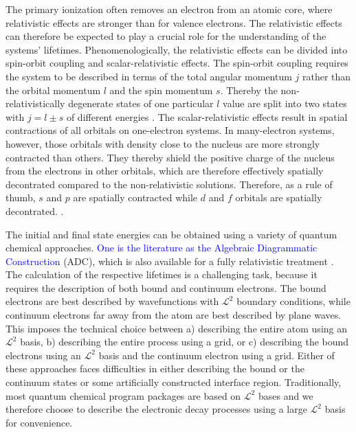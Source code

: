The primary ionization often removes an electron from an atomic core, where
relativistic effects are stronger than for valence electrons. The relativistic
effects can therefore be expected to play a crucial role for the understanding
of the systems' lifetimes.
Phenomenologically, the relativistic effects can be divided  
into spin-orbit coupling and scalar-relativistic effects. The spin-orbit       
coupling requires the system to be described in terms of the total angular     
momentum $j$ rather than the orbital momentum $l$ and the spin momentum $s$.   
Thereby the non-relativistically degenerate states of one particular $l$       
value are split into two states with $j=l\pm s$ of different energies          
\cite{ReiherWolf09}.                                            
The scalar-relativistic effects result in spatial contractions of all orbitals on
one-electron systems. In many-electron systems, however, those orbitals with density close
to the nucleus are more strongly contracted than others. They thereby
shield the positive charge of the nucleus from the electrons in other orbitals,
which are therefore effectively spatially decontrated compared to the non-relativistic
solutions. Therefore, as a rule of thumb, $s$ and $p$ are spatially contracted while
$d$ and $f$ orbitals are spatially decontrated. \cite{ReiherWolf09}.

The initial and final state energies can be obtained using      
a variety of quantum chemical approaches.
\textcolor{blue}
{
One is the literature as the       
Algebraic Diagrammatic Construction \cite{Schirmer_book,Schirmer82_1,Schirmer83,Schirmer91,Schirmer98, 
Mertins96_1}} (ADC), which is also                               
available for a fully relativistic treatment                    
\cite{Pernpointner04_1,Pernpointner04_2,Pernpointner10_1}.
The calculation of the respective lifetimes is a challenging task, because it
requires the description of both bound and continuum electrons. The bound electrons
are best described by wavefunctions with $\mathcal{L}^2$ boundary conditions,
while continuum electrons far away from the atom are best described by
plane waves. This imposes the technical choice between a) describing the entire
atom using an $\mathcal{L}^2$ basis, b) describing the entire process using
a grid, or c) describing the bound electrons using an $\mathcal{L}^2$ basis
and the continuum electron using a grid.
Either     
of these approaches faces difficulties in either describing the bound or the  
continuum states or some artificially constructed interface region.
Traditionally, most quantum
chemical program packages are based on $\mathcal{L}^2$ bases and we therefore
choose to describe the electronic decay processes using a large $\mathcal{L}^2$
basis for convenience.

